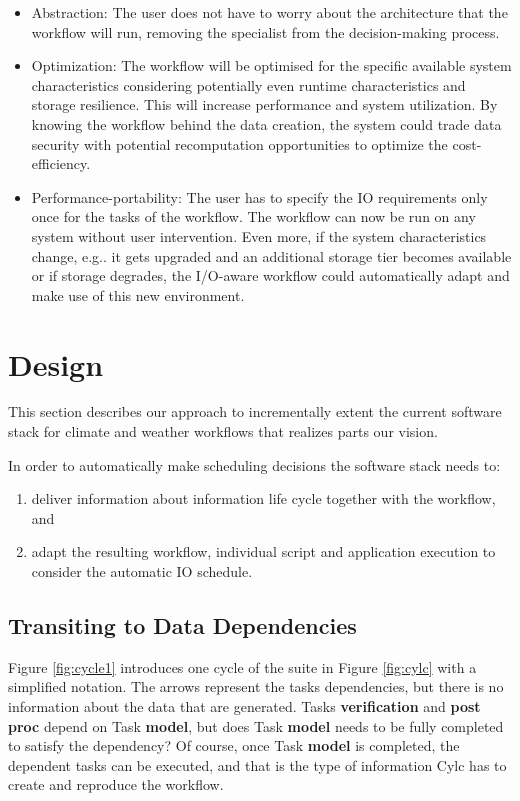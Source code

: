 \documentclass[a4paper]{article}
\begin{document}
\begin{itemize}
\item Abstraction: The user does not have to worry about the architecture that the workflow will run, removing the specialist from the decision-making process.

\item Optimization: The workflow will be optimised for the specific available system characteristics considering potentially even runtime characteristics and storage resilience.
This will increase performance and system utilization.
By knowing the workflow behind the data creation, the system could trade data security with potential recomputation opportunities to optimize the cost-efficiency.

\item Performance-portability: The user has to specify the IO requirements only once for the tasks of the workflow.
The workflow can now be run on any system without user intervention.
Even more, if the system characteristics change, e.g.. it gets upgraded and an additional storage tier becomes available or if storage degrades, the I/O-aware workflow could automatically adapt and make use of this new environment.

\end{itemize}


\section{Design}

This section describes our approach to incrementally extent the current software stack for climate and weather workflows that realizes parts our vision.

In order to automatically make scheduling decisions the software stack needs to:
\begin{enumerate}
\item deliver information about information life cycle together with the workflow, and
\item adapt the resulting workflow, individual script and application execution to consider the automatic IO schedule.
\end{enumerate}

\subsection{Transiting to Data Dependencies}

Figure \ref{fig:cycle1} introduces one cycle of the suite in Figure \ref{fig:cylc} with a simplified notation. The arrows represent the tasks dependencies, but there is no information about the data that are generated. Tasks \textbf{verification} and \textbf{post\,proc} depend on Task \textbf{model}, but does Task \textbf{model} needs to be fully completed to satisfy the dependency?
Of course, once Task \textbf{model} is completed, the dependent tasks can be executed, and that is the type of information Cylc has to create and reproduce the workflow.
\end{document}

